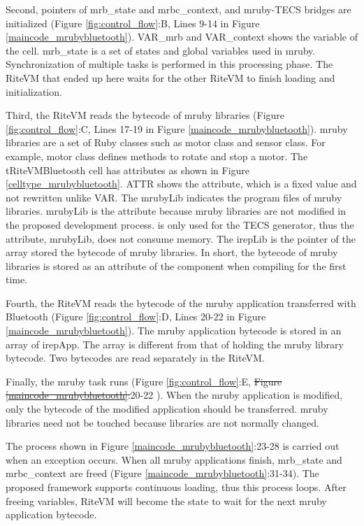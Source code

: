 \documentclass{sig-alternate-05-2015}
\providecommand{\DIFadd}[1]{{\protect\color{blue}\uwave{#1}}} %
\providecommand{\DIFdel}[1]{{\protect\color{red}\sout{#1}}}                      %
\providecommand{\DIFaddbegin}{} %
\providecommand{\DIFaddend}{} %
\providecommand{\DIFdelbegin}{} %
\providecommand{\DIFdelend}{} %
\begin{document}
Second, pointers of {\myit mrb\_state} and {\myit mrbc\_context}, and mruby-TECS bridges are initialized (Figure \ref{fig:control_flow}:B, Lines 9-14 in Figure \ref{maincode_mrubybluetooth}).
{\myit VAR\_mrb} and {\myit VAR\_context} shows the variable of the {\myit cell}.
{\myit mrb\_state} is a set of states and global variables used in mruby.
Synchronization of multiple tasks is performed in this processing phase.
The RiteVM that ended up here waits for the other RiteVM to finish loading and initialization.

Third, the RiteVM reads the bytecode of mruby libraries (Figure \ref{fig:control_flow}:C, Lines 17-19 in Figure \ref{maincode_mrubybluetooth}).
mruby libraries are a set of Ruby classes such as motor class and sensor class.
For example, motor class defines methods to rotate and stop a motor.
The tRiteVMBluetooth {\myit cell} has attributes as shown in Figure \ref{celltype_mrubybluetooth}.
{\myit ATTR} shows the attribute, which is a fixed value and not rewritten unlike {\myit VAR}.
The {\myit mrubyLib} indicates the program files of mruby libraries.
{\myit mrubyLib} is the attribute because mruby libraries are not modified in the proposed development process.
{\myit [omit]} is only used for the TECS generator, thus the attribute, {\myit mrubyLib}, does not consume memory.
The {\myit irepLib} is the pointer of the array stored the bytecode of mruby libraries.
In short, the bytecode of mruby libraries is stored as an attribute of the component when compiling for the first time.

Fourth, the RiteVM reads the bytecode of the mruby application transferred with Bluetooth (Figure \ref{fig:control_flow}:D, Lines 20-22 in Figure \ref{maincode_mrubybluetooth}).
The mruby application bytecode is stored in an array of {\myit irepApp}.
The array is different from that of holding the mruby library bytecode.
Two bytecodes are read separately in the RiteVM.

Finally, the mruby task runs (Figure \ref{fig:control_flow}:E, \DIFdelbegin \DIFdel{Figure \ref{maincode_mrubybluetooth}:}\DIFdelend \DIFaddbegin \DIFadd{Lines }\DIFaddend 20-22 \DIFaddbegin \DIFadd{in Figure \ref{maincode_mrubybluetooth}}\DIFaddend ).
When the mruby application is modified, only the bytecode of the modified application should be transferred.
mruby libraries need not be touched because libraries are not normally changed.

The process shown in Figure \ref{maincode_mrubybluetooth}:23-28 is carried out when an exception occurs.
When all mruby applications finish, mrb\_state and mrbc\_context are freed (Figure \ref{maincode_mrubybluetooth}:31-34).
The proposed framework supports continuous loading, thus this process loops.
After freeing variables, RiteVM will become the state to wait for the next mruby application bytecode.
\end{document}
